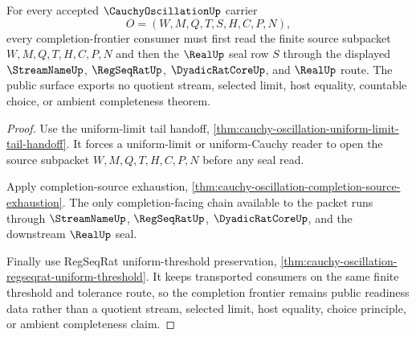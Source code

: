 \begin{theorem}
\label{thm:cauchy-oscillation-completion-frontier-public-readiness}
For every accepted $\CauchyOscillationUp$ carrier
$$
O=(W,M,Q,T,S,H,C,P,N),
$$
every completion-frontier consumer must first read the finite source subpacket $W,M,Q,T,H,C,P,N$ and then the $\RealUp$ seal row $S$ through the displayed $\StreamNameUp$, $\RegSeqRatUp$, $\DyadicRatCoreUp$, and $\RealUp$ route. The public surface exports no quotient stream, selected limit, host equality, countable choice, or ambient completeness theorem.
\end{theorem}
\begin{proof}
Use the uniform-limit tail handoff, \autoref{thm:cauchy-oscillation-uniform-limit-tail-handoff}. It forces a uniform-limit or uniform-Cauchy reader to open the source subpacket $W,M,Q,T,H,C,P,N$ before any seal read.

Apply completion-source exhaustion, \autoref{thm:cauchy-oscillation-completion-source-exhaustion}. The only completion-facing chain available to the packet runs through $\StreamNameUp$, $\RegSeqRatUp$, $\DyadicRatCoreUp$, and the downstream $\RealUp$ seal.

Finally use RegSeqRat uniform-threshold preservation, \autoref{thm:cauchy-oscillation-regseqrat-uniform-threshold}. It keeps transported consumers on the same finite threshold and tolerance route, so the completion frontier remains public readiness data rather than a quotient stream, selected limit, host equality, choice principle, or ambient completeness claim.
\end{proof}

